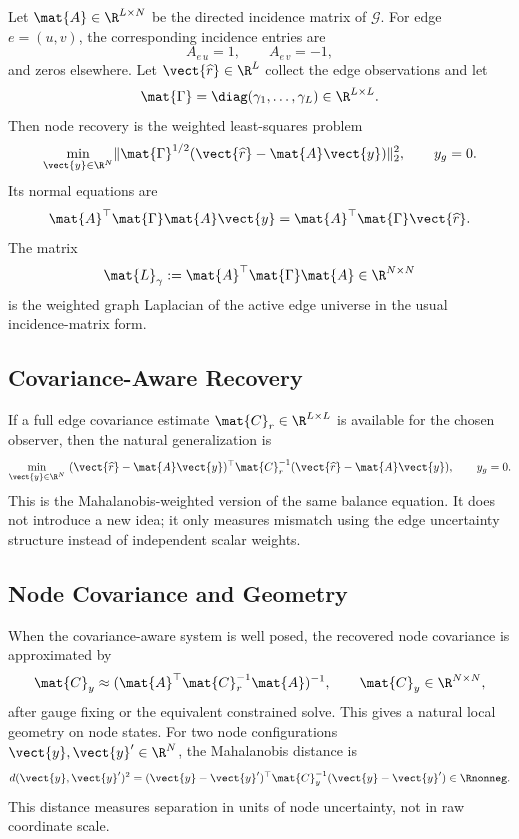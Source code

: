 Let $\mat{A} \in \R^{L \times N}$ be the directed incidence matrix of
$\mathcal{G}$.  For edge $e=(u,v)$, the corresponding incidence entries are
\[
  A_{e\,u}=1,\qquad A_{e\,v}=-1,
\]
and zeros elsewhere.  Let $\vect{\widehat{r}} \in \R^L$ collect the edge
observations and let
\[
  \mat{\Gamma} = \diag(\gamma_1,\ldots,\gamma_L)
  \in \R^{L \times L}.
\]
Then node recovery is the weighted least-squares problem
\[
  \min_{\vect{y} \in \R^N}
  \lVert \mat{\Gamma}^{1/2}(\vect{\widehat{r}} - \mat{A}\vect{y}) \rVert_2^2,
  \qquad y_g = 0.
\]
Its normal equations are
\[
  \mat{A}^{\top}\mat{\Gamma}\mat{A}\vect{y}
  =
  \mat{A}^{\top}\mat{\Gamma}\vect{\widehat{r}}.
\]
The matrix
\[
  \mat{L}_{\gamma} := \mat{A}^{\top}\mat{\Gamma}\mat{A}
  \in \R^{N \times N}
\]
is the weighted graph Laplacian of the active edge universe in the usual
incidence-matrix form.

\subsection{Covariance-Aware Recovery}
\label{subsec:covariance-aware-recovery}

If a full edge covariance estimate $\mat{C}_r \in \R^{L \times L}$ is available
for the chosen observer, then the natural generalization is
\[
  \min_{\vect{y} \in \R^N}\ (
  \vect{\widehat{r}} - \mat{A}\vect{y}
  )^{\top}
  \mat{C}_r^{-1}
  (
  \vect{\widehat{r}} - \mat{A}\vect{y}
  ),
  \qquad y_g = 0.
\]
This is the Mahalanobis-weighted version of the same balance equation.  It does
not introduce a new idea; it only measures mismatch using the edge uncertainty
structure instead of independent scalar weights.

\subsection{Node Covariance and Geometry}
\label{subsec:node-covariance-and-geometry}

When the covariance-aware system is well posed, the recovered node covariance is
approximated by
\[
  \mat{C}_y \approx (\mat{A}^{\top}\mat{C}_r^{-1}\mat{A})^{-1},
  \qquad
  \mat{C}_y \in \R^{N \times N},
\]
after gauge fixing or the equivalent constrained solve.  This gives a natural
local geometry on node states.  For two node configurations
$\vect{y},\vect{y}' \in \R^N$, the Mahalanobis distance is
\[
  d(\vect{y},\vect{y}')^2
  =
  (\vect{y} - \vect{y}')^{\top}
  \mat{C}_y^{-1}
  (\vect{y} - \vect{y}')
  \in \Rnonneg.
\]
This distance measures separation in units of node uncertainty, not in raw
coordinate scale.

